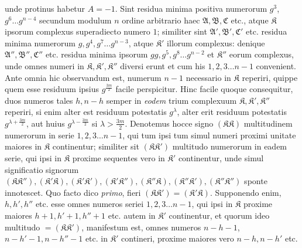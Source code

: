 unde protinus habetur \(A=-1\). Sint residua minima positiva numerorum \(g^3\), \(g^6\ldots g^{n-4}\) secundum modulum \(n\) ordine arbitrario haec \(\mathfrak A,\allowbreak \mathfrak B,\allowbreak \mathfrak C\) etc., atque \(\mathfrak K\) ipsorum complexus superadiecto numero \(1\); similiter sint \(\mathfrak A',\allowbreak \mathfrak B',\allowbreak \mathfrak C'\) etc. residua minima numerorum \(g,\allowbreak g^4,\allowbreak g^7\ldots g^{n-3}\), atque \(\mathfrak K'\) illorum complexus: denique \(\mathfrak A'',\allowbreak \mathfrak B'',\allowbreak \mathfrak C''\) etc. residua minima ipsorum \(gg,\allowbreak g^5,\allowbreak g^8\ldots g^{n-2}\) et \(\mathfrak K''\) eorum complexus, unde omnes numeri in \(\mathfrak K,\allowbreak \mathfrak K',\allowbreak \mathfrak K''\) diversi erunt et cum his \(1,\allowbreak 2,\allowbreak 3\ldots n-1\) convenient. Ante omnia hic observandum est, numerum \(n-1\) necessario in \(\mathfrak K\) reperiri, quippe quem esse residuum ipsius \(g^{\frac{3m}{2}}\) facile perspicitur. Hinc facile quoque consequitur, duos numeros tales \(h,\allowbreak n-h\) semper in \textit{eodem} trium complexuum \(\mathfrak K,\allowbreak \mathfrak K',\allowbreak \mathfrak K''\) reperiri, si enim alter est residuum potestatis \(g^\lambda\), alter erit residuum potestatis \(g^{\lambda+\frac{3m}{2}}\), aut huius \(g^{\lambda-\frac{3m}{2}}\) si \(\lambda>\frac{3m}{2}\). Denotemus hocce signo \((\mathfrak K\mathfrak K)\) multitudinem numerorum in serie \(1,\allowbreak 2,\allowbreak 3\ldots n-1\), qui tum ipsi tum simul numeri proximi unitate maiores in \(\mathfrak K\) continentur; similiter sit \((\mathfrak K\mathfrak K')\) multitudo numerorum in eadem serie, qui ipsi in \(\mathfrak K\) proxime sequentes vero in \(\mathfrak K'\) continentur, unde simul significatio signorum \((\mathfrak K\mathfrak K''),\allowbreak (\mathfrak K'\mathfrak K),\allowbreak (\mathfrak K'\mathfrak K'),\allowbreak (\mathfrak K'\mathfrak K''),\allowbreak (\mathfrak K''\mathfrak K),\allowbreak (\mathfrak K''\mathfrak K'),\allowbreak (\mathfrak K''\mathfrak K'')\) sponte innotescet. Quo facto dico \textit{primo}, fieri \((\mathfrak K\mathfrak K')=(\mathfrak K'\mathfrak K)\). Supponendo enim, \(h,\allowbreak h',\allowbreak h''\) etc. esse omnes numeros seriei \(1,\allowbreak 2,\allowbreak 3\ldots n-1\), qui ipsi in \(\mathfrak K\) proxime maiores \(h+1,\allowbreak h'+1,\allowbreak h''+1\) etc. autem in \(\mathfrak K'\) continentur, et quorum ideo multitudo \(=(\mathfrak K\mathfrak K')\), manifestum est, omnes numeros \(n-h-1\), \(n-h'-1,\allowbreak n-h''-1\) etc. in \(\mathfrak K'\) contineri, proxime maiores vero \(n-h,\allowbreak n-h'\) etc.
